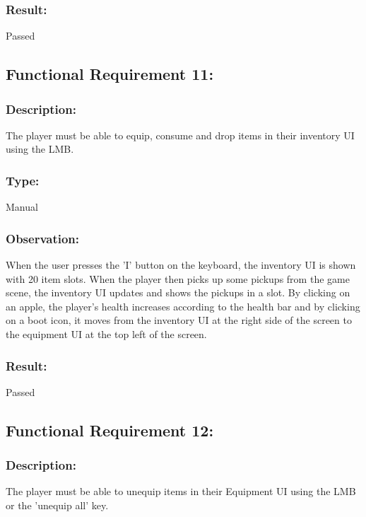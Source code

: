 \documentclass[12pt, titlepage]{article}
\begin{document}
\subsubsection[Pass / Fail:] {Result: } Passed

\subsection{Functional Requirement 11: } 

\subsubsection{Description: }The player must be able to equip, consume and drop items in their inventory UI using the LMB.

\subsubsection{Type: } Manual

\subsubsection{Observation: } When the user  presses the 'I' button on the keyboard, the inventory UI is shown with 20 item slots. When the player then picks up some pickups from the game scene, the inventory UI updates and shows the pickups in a slot. By clicking on an apple, the player's health increases according to the health bar and by clicking on a boot icon, it moves from the inventory UI at the right side of the screen to the equipment UI at the top left of the screen.

\subsubsection[Pass / Fail:] {Result: } Passed


\subsection{Functional Requirement 12: } 

\subsubsection{Description: }The player must be able to unequip items in their Equipment UI using the LMB or the 'unequip all' key.
\end{document}

